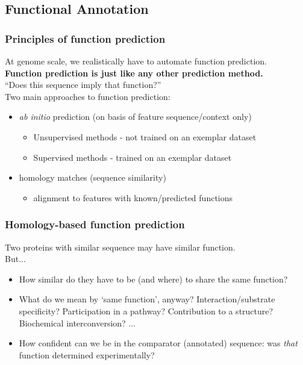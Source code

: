 
\subsection{Functional Annotation}

\begin{frame}
  \frametitle{Principles of function prediction}
  At genome scale, we realistically have to automate function prediction. \\
  \textbf{Function prediction is just like any other prediction method.} \\
  ``Does this sequence imply that function?''\\[0.25cm]
  Two main approaches to function prediction:
  \begin{itemize}
    \item \textit{ab initio} prediction (on basis of feature sequence/context only)
    \begin{itemize}
      \item Unsupervised methods - not trained on an exemplar dataset
      \item Supervised methods - trained on an exemplar dataset
    \end{itemize}
    \item homology matches (sequence similarity)
    \begin{itemize}
      \item alignment to features with known/predicted functions
    \end{itemize}
  \end{itemize}
\end{frame}

\begin{frame}
  \frametitle{Homology-based function prediction}
  Two proteins with similar sequence may have similar function.\\
  But$\ldots$
  \begin{itemize}
    \item How similar do they have to be (and where) to share the same function?
    \item What do we mean by `same function', anyway? Interaction/substrate specificity? Participation in a pathway? Contribution to a structure? Biochemical interconversion? $\ldots$
    \item How confident can we be in the comparator (annotated) sequence: was \textit{that} function determined experimentally?
  \end{itemize}
\end{frame}

